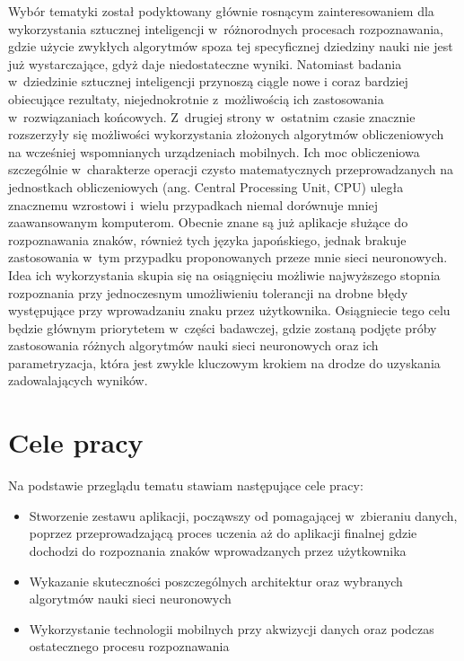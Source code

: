 Wybór tematyki został podyktowany głównie rosnącym zainteresowaniem dla wykorzystania sztucznej inteligencji w~różnorodnych procesach rozpoznawania, gdzie użycie zwykłych algorytmów spoza tej specyficznej dziedziny nauki nie jest już wystarczające, gdyż daje niedostateczne wyniki. Natomiast badania w~dziedzinie sztucznej inteligencji przynoszą ciągle nowe i coraz bardziej obiecujące rezultaty, niejednokrotnie z~możliwością ich zastosowania w~rozwiązaniach końcowych. Z~drugiej strony w~ostatnim czasie znacznie rozszerzyły się możliwości wykorzystania złożonych algorytmów obliczeniowych na wcześniej wspomnianych urządzeniach mobilnych. Ich moc obliczeniowa szczególnie w~charakterze operacji czysto matematycznych przeprowadzanych na jednostkach obliczeniowych (ang. Central Processing Unit, CPU) uległa znacznemu wzrostowi i~wielu przypadkach niemal dorównuje mniej zaawansowanym komputerom.
Obecnie znane są już aplikacje służące do rozpoznawania znaków, również tych języka japońskiego, jednak brakuje zastosowania w~tym przypadku proponowanych przeze mnie sieci neuronowych. Idea ich wykorzystania skupia się na osiągnięciu możliwie najwyższego stopnia rozpoznania przy jednoczesnym umożliwieniu tolerancji na drobne błędy występujące przy wprowadzaniu znaku przez użytkownika. Osiągniecie tego celu będzie głównym priorytetem w~części badawczej, gdzie zostaną podjęte próby zastosowania różnych algorytmów nauki sieci neuronowych oraz ich parametryzacja, która jest zwykle kluczowym krokiem na drodze do uzyskania zadowalających wyników. 


\section{Cele pracy}\label{sec:cele_pracy}
Na podstawie przeglądu tematu stawiam następujące cele pracy:

\begin{itemize}
 \item Stworzenie zestawu aplikacji, począwszy od pomagającej w~zbieraniu danych, poprzez przeprowadzającą proces uczenia aż do aplikacji finalnej gdzie dochodzi do rozpoznania znaków wprowadzanych przez użytkownika
 \item Wykazanie  skuteczności poszczególnych architektur oraz wybranych algorytmów nauki sieci neuronowych
 \item Wykorzystanie technologii mobilnych przy akwizycji danych oraz podczas ostatecznego procesu rozpoznawania
\end{itemize}


